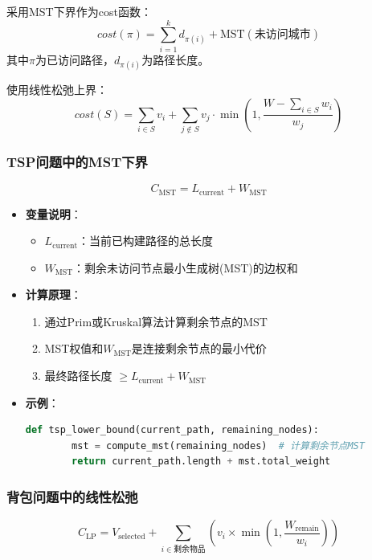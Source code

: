 \documentclass[./../main.tex]{subfiles}
\begin{document}
采用MST下界作为cost函数：
$$
cost(\pi) = \sum_{i=1}^k d_{\pi(i)} + \text{MST}(\text{未访问城市})
$$
其中$\pi$为已访问路径，$d_{\pi(i)}$为路径长度。


使用线性松弛上界：
$$
cost(S) = \sum_{i\in S}v_i + \sum_{j\notin S} v_j \cdot \min\left(1,\frac{W-\sum_{i\in S}w_i}{w_j}\right)
$$

\subsubsection{TSP问题中的MST下界}
\begin{equation*}
C_{\text{MST}} = L_{\text{current}} + W_{\text{MST}}
\end{equation*}

\begin{itemize}
    \item \textbf{变量说明}：
    \begin{itemize}
        \item $L_{\text{current}}$：当前已构建路径的总长度
        \item $W_{\text{MST}}$：剩余未访问节点最小生成树(MST)的边权和
    \end{itemize}
    
    \item \textbf{计算原理}：
    \begin{enumerate}
        \item 通过Prim或Kruskal算法计算剩余节点的MST
        \item MST权值和$W_{\text{MST}}$是连接剩余节点的最小代价
        \item 最终路径长度 $\geq L_{\text{current}} + W_{\text{MST}}$
    \end{enumerate}
    
    \item \textbf{示例}：
    \begin{lstlisting}[language=Python]
    def tsp_lower_bound(current_path, remaining_nodes):
        mst = compute_mst(remaining_nodes)  # 计算剩余节点MST
        return current_path.length + mst.total_weight
    \end{lstlisting}
\end{itemize}

\subsubsection{背包问题中的线性松弛}
\begin{equation*}
C_{\text{LP}} = V_{\text{selected}} + \sum_{i \in \text{剩余物品}} \left(v_i \times \min\left(1,\frac{W_{\text{remain}}}{w_i}\right)\right)
\end{equation*}
\end{document}
